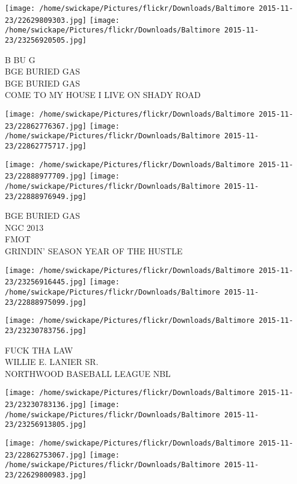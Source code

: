 \documentclass[10pt,letterpaper]{article}
\begin{document}
\texttt{[image: /home/swickape/Pictures/flickr/Downloads/Baltimore 2015-11-23/22629809303.jpg]}
\texttt{[image: /home/swickape/Pictures/flickr/Downloads/Baltimore 2015-11-23/23256920505.jpg]}

B BU G\\
BGE BURIED GAS\\
BGE BURIED GAS\\
COME TO MY HOUSE I LIVE ON SHADY ROAD\\
\pagebreak

\texttt{[image: /home/swickape/Pictures/flickr/Downloads/Baltimore 2015-11-23/22862776367.jpg]}
\texttt{[image: /home/swickape/Pictures/flickr/Downloads/Baltimore 2015-11-23/22862775717.jpg]}

\texttt{[image: /home/swickape/Pictures/flickr/Downloads/Baltimore 2015-11-23/22888977709.jpg]}
\texttt{[image: /home/swickape/Pictures/flickr/Downloads/Baltimore 2015-11-23/22888976949.jpg]}

BGE BURIED GAS\\
NGC 2013\\
FMOT\\
GRINDIN' SEASON YEAR OF THE HUSTLE\\
\pagebreak

\texttt{[image: /home/swickape/Pictures/flickr/Downloads/Baltimore 2015-11-23/23256916445.jpg]}
\texttt{[image: /home/swickape/Pictures/flickr/Downloads/Baltimore 2015-11-23/22888975099.jpg]}

\vspace{0.25in}
\texttt{[image: /home/swickape/Pictures/flickr/Downloads/Baltimore 2015-11-23/23230783756.jpg]}

FUCK THA LAW\\
WILLIE E. LANIER SR.\\
NORTHWOOD BASEBALL LEAGUE NBL\\
\pagebreak

\texttt{[image: /home/swickape/Pictures/flickr/Downloads/Baltimore 2015-11-23/23230783136.jpg]}
\texttt{[image: /home/swickape/Pictures/flickr/Downloads/Baltimore 2015-11-23/23256913805.jpg]}

\texttt{[image: /home/swickape/Pictures/flickr/Downloads/Baltimore 2015-11-23/22862753067.jpg]}
\texttt{[image: /home/swickape/Pictures/flickr/Downloads/Baltimore 2015-11-23/22629800983.jpg]}
\end{document}
